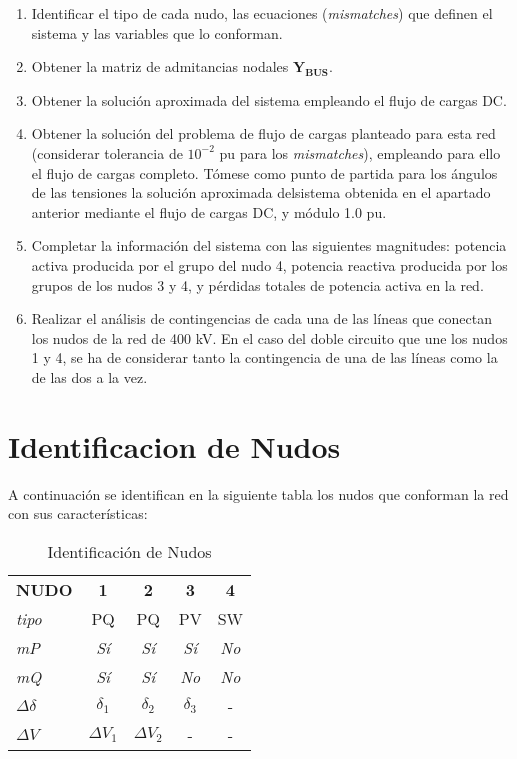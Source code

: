 \documentclass[a4paper,10pt,titlepage,oneside]{article}
\begin{document}
{\begin{enumerate}
    \item Identificar el tipo de cada nudo, las ecuaciones (\textit{mismatches}) que definen el sistema y las
    variables que lo conforman.
    \item Obtener la matriz de admitancias nodales $\mathbf{Y_{BUS}}$.
    \item Obtener la solución aproximada del sistema empleando el flujo de cargas DC. 
    \item Obtener la solución del problema de flujo de cargas planteado para esta red (considerar
    tolerancia de $10^{-2}$ pu para los \textit{mismatches}), empleando para ello el flujo de cargas completo. Tómese como punto de partida para los ángulos de las tensiones la solución aproximada delsistema obtenida en el apartado anterior mediante el flujo de cargas DC, y módulo 1.0 pu. 
    \item Completar la información del sistema con las siguientes magnitudes: potencia activa producida por el grupo del nudo 4, potencia reactiva producida por los grupos de los nudos 3 y 4, y pérdidas totales de potencia activa en la red.
    \item Realizar el análisis de contingencias de cada una de las líneas que conectan los nudos de la red de 400 kV. En el caso del doble circuito que une los nudos 1 y 4, se ha de considerar tanto
    la contingencia de una de las líneas como la de las dos a la vez.
\end{enumerate}
\noindent

\newpage

\section{Identificacion de Nudos}
A continuación se identifican en la siguiente tabla los nudos que conforman la red con sus características:\\
\begin{table}[h!]
        \centering
            \begin{tabular}[h]{l c c c c }
                \rowcolor[gray]{1}\textbf{NUDO} & \textbf{1} &\textbf{2} & \textbf{3} &\textbf{4} \\ 
                \cline{1-5} 
                \rowcolor[gray]{0.8}\textit{tipo} & PQ &PQ & PV & SW \\ 
                \cline{1-5} 
                \rowcolor[gray]{0.6}\textit{mP} & \textit{Sí} & \textit{Sí}  & \textit{Sí}& \textit{No} \\
                \cline{1-5}
                \rowcolor[gray]{0.8}\textit{mQ} & \textit{Sí} & \textit{Sí} & \textit{No} & \textit{No}\\
                \cline{1-5}
               \rowcolor[gray]{0.6} $\Delta\delta$& $\delta_1$ & $\delta_2$ & $\delta_3$ & - \\
                \cline{1-5} 
               \rowcolor[gray]{0.8} $\Delta V$ & $\Delta V_1$ & $\Delta V_2$ & - & - \\
            \end{tabular}
 \caption{Identificación de Nudos}
\end{table}

}
\end{document}
